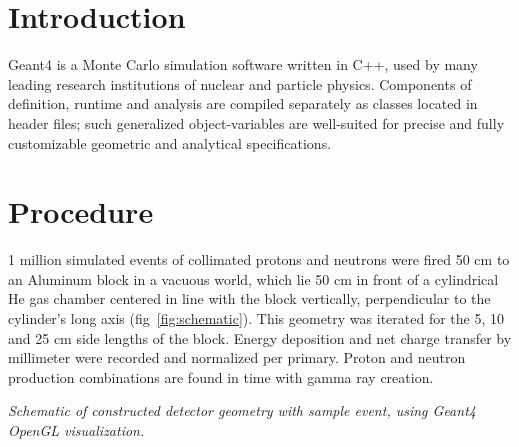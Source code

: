 \documentclass[11pt]{article}
\makeatletter
\newenvironment{figurehere}
{\def\@captype{figure}}{}
\makeatother
\begin{document}
\begin{multicols}{2}

\section{Introduction}

Geant4 is a Monte Carlo simulation software written in C++, used by many leading research institutions of nuclear and particle physics\cite{?}.  Components of definition, runtime and analysis are compiled separately as classes located in header files; such generalized object-variables are well-suited for precise and fully customizable geometric and analytical specifications.

\section{Procedure}

1 million simulated events of collimated protons and neutrons were fired 50 cm to an Aluminum block in a vacuous world, which lie 50 cm in front of a cylindrical He gas chamber centered in line with the block vertically, perpendicular to the cylinder's long axis (fig~\ref{fig:schematic}).  This geometry was iterated for the 5, 10 and 25 cm side lengths of the block.  Energy deposition and net charge transfer by millimeter were recorded and normalized per primary.  Proton and neutron production combinations are found in time with gamma ray creation.

\vspace{0.25 cm}
\begin{figurehere}
\centering
{}
\caption{\small \emph{Schematic of constructed detector geometry with sample event, using Geant4 OpenGL visualization.}}
\label{fig:schematic}
\end{figurehere}
\vspace{0.25 cm}


\end{multicols}
\end{document}
